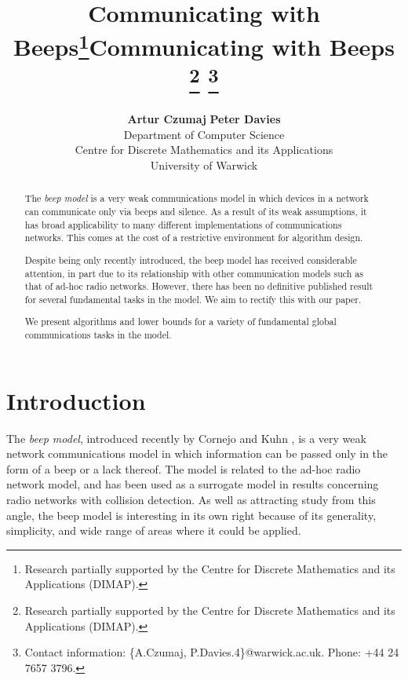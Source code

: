 \documentclass{article}
\title{Communicating with Beeps\footnote{Research partially supported by the Centre for Discrete Mathematics and its Applications (DIMAP).}}
\begin{document}
	



\author{\textbf{Artur Czumaj} \hspace{4mm} \textbf{Peter Davies} \\[0.10in]
	Department of Computer Science \\
	Centre for Discrete Mathematics and its Applications \\
	University of Warwick}

\title{\textbf{Communicating with Beeps}
	\thanks{Research partially supported by the Centre for Discrete Mathematics and its Applications (DIMAP).}
	\thanks{Contact information: \{A.Czumaj, P.Davies.4\}@warwick.ac.uk. Phone: +44 24 7657 3796.}
}

\maketitle
		
\begin{abstract}
The \emph{beep model} is a very weak communications model in which devices in a network can communicate only via beeps and silence. As a result of its weak assumptions, it has broad applicability to many different implementations of communications networks. This comes at the cost of a restrictive environment for algorithm design.

Despite being only recently introduced, the beep model has received considerable attention, in part due to its relationship with other communication models such as that of ad-hoc radio networks. However, there has been no definitive published result for several fundamental tasks in the model. We aim to rectify this with our paper.

We present algorithms and lower bounds for a variety of fundamental global communications tasks in the model.
\end{abstract}


\section{Introduction}

The \emph{beep model}, introduced recently by Cornejo and Kuhn \cite{-CK10}, is a very weak network communications model in which information can be passed only in the form of a beep or a lack thereof. The model is related to the ad-hoc radio network model, and has been used as a surrogate model in results concerning radio networks with collision detection. As well as attracting study from this angle, the beep model is interesting in its own right because of its generality, simplicity, and wide range of areas where it could be applied.
\end{document}
